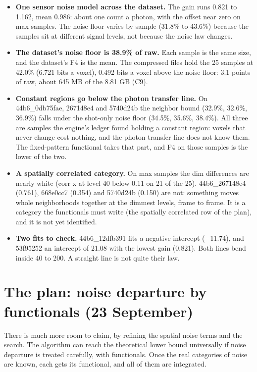 \begin{itemize}
\item \textbf{One sensor noise model across the dataset.} The gain runs 0.821 to 1.162, mean 0.986: about one count a photon, with the offset near zero on max samples. The noise floor varies by sample (31.8\% to 43.6\%) because the samples sit at different signal levels, not because the noise law changes.
\item \textbf{The dataset's noise floor is 38.9\% of raw.} Each sample is the same size, and the dataset's F4 is the mean. The compressed files hold the 25 samples at 42.0\% (6.721 bits a voxel), 0.492 bits a voxel above the noise floor: 3.1 points of raw, about 645 MB of the 8.81 GB (C9).
\item \textbf{Constant regions go below the photon transfer line.} On 44b6\_\allowbreak{}0db75fae, 267148e4 and 5740d24b the neighbor bound (32.9\%, 32.6\%, 36.9\%) falls under the shot-only noise floor (34.5\%, 35.6\%, 38.4\%). All three are samples the engine's ledger found holding a constant region: voxels that never change cost nothing, and the photon transfer line does not know them. The fixed-pattern functional takes that part, and F4 on those samples is the lower of the two.
\item \textbf{A spatially correlated category.} On max samples the dim differences are nearly white (corr x at level 40 below 0.11 on 21 of the 25). 44b6\_\allowbreak{}267148e4 (0.761), 668e0cc7 (0.354) and 5740d24b (0.150) are not: something moves whole neighborhoods together at the dimmest levels, frame to frame. It is a category the functionals must write (the spatially correlated row of the plan), and it is not yet identified.
\item \textbf{Two fits to check.} 44b6\_\allowbreak{}12dfb391 fits a negative intercept (−11.74), and 53f95252 an intercept of 21.08 with the lowest gain (0.821). Both lines bend inside 40 to 200. A straight line is not quite their law.
\end{itemize}

\section{\texorpdfstring{The plan: noise departure by functionals (23 September)}{The plan: noise departure by functionals (23 September)}}

There is much more room to claim, by refining the spatial noise terms and the search. The algorithm can reach the theoretical lower bound universally if noise departure is treated carefully, with functionals. Once the real categories of noise are known, each gets its functional, and all of them are integrated.

